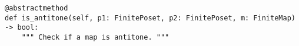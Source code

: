 \begin{verbatim}
@abstractmethod
def is_antitone(self, p1: FinitePoset, p2: FinitePoset, m: FiniteMap) -> bool:
    """ Check if a map is antitone. """
\end{verbatim}